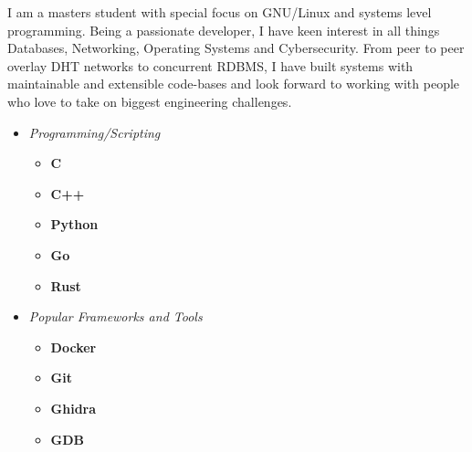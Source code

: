 \documentclass[9]{Resume}
\begin{document}
\begin{minipage}[t]{0.45\textwidth}
    \vspace{-\baselineskip}

        I am a masters student with special focus on GNU/Linux and systems level programming.
        Being a passionate developer, I have keen interest in all things Databases, Networking, Operating Systems and Cybersecurity.
        From peer to peer overlay DHT networks to concurrent RDBMS, I have built systems with maintainable and extensible code-bases and look forward to working with people who love to take on biggest engineering challenges.
\end{minipage}
\hfill
\begin{minipage}[t]{0.45\textwidth}
    \vspace{-\baselineskip}

    \begin{itemize}[noitemsep,nolistsep,leftmargin=*]
    \setlength\itemsep{-1em}
    \item[]\textit{Programming/Scripting}
            \vspace{-1em}
            \begin{multicols}{2}
            \begin{itemize}[leftmargin=*]
            \setlength\itemsep{-0.25em}
                \item[]\textbf{C}\hspace{48pt}
                \item[]\textbf{C++}\hspace{37pt}
                \item[]\textbf{Python}\hspace{25pt}
                \item[]\textbf{Go}\hspace{28pt}
                \item[]\textbf{Rust}\hspace{21.5pt}
            \end{itemize}
            \end{multicols}

    \item[]\textit{Popular Frameworks and Tools}
            \vspace{-1em}
            \begin{multicols}{2}
            \begin{itemize}[leftmargin=*]
            \setlength\itemsep{-0.25em}
                \item[]\textbf{Docker}\hspace{25pt}
                \item[]\textbf{Git}\hspace{42pt}
                \item[]\textbf{Ghidra}\hspace{11pt}
                \item[]\textbf{GDB}\hspace{21pt}
            \end{itemize}
            \end{multicols}


\end{itemize}
\end{minipage}
\end{document}
